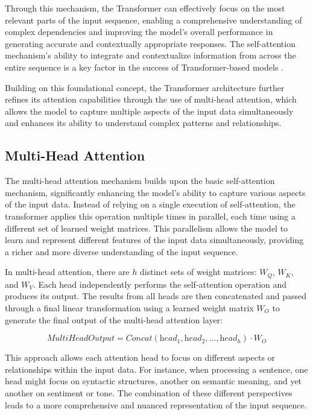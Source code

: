 Through this mechanism, the Transformer can effectively focus on the most relevant parts of the input sequence, enabling a comprehensive understanding of complex dependencies and improving the model's overall performance in generating accurate and contextually appropriate responses. The self-attention mechanism's ability to integrate and contextualize information from across the entire sequence is a key factor in the success of Transformer-based models \cite{geeksforgeeks2024-sa}.

Building on this foundational concept, the Transformer architecture further refines its attention capabilities through the use of multi-head attention, which allows the model to capture multiple aspects of the input data simultaneously and enhances its ability to understand complex patterns and relationships.

\subsection{Multi-Head Attention}

The multi-head attention mechanism builds upon the basic self-attention mechanism, significantly enhancing the model's ability to capture various aspects of the input data. Instead of relying on a single execution of self-attention, the transformer applies this operation multiple times in parallel, each time using a different set of learned weight matrices. This parallelism allows the model to learn and represent different features of the input data simultaneously, providing a richer and more diverse understanding of the input sequence.

In multi-head attention, there are \( h \) distinct sets of weight matrices: \( W_Q \), \( W_K \), and \( W_V \). Each head independently performs the self-attention operation and produces its output. The results from all heads are then concatenated and passed through a final linear transformation using a learned weight matrix \( W_O \) to generate the final output of the multi-head attention layer:

\begin{equation}
    \textit{MultiHeadOutput} = \textit{Concat}(\textit{head}_1, \textit{head}_2, \ldots, \textit{head}_h) \cdot W_O
\end{equation}

This approach allows each attention head to focus on different aspects or relationships within the input data. For instance, when processing a sentence, one head might focus on syntactic structures, another on semantic meaning, and yet another on sentiment or tone. The combination of these different perspectives leads to a more comprehensive and nuanced representation of the input sequence.

